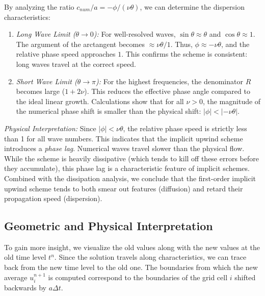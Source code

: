 By analyzing the ratio \(c_{num}/a = -\phi / (\nu\theta)\), we can determine the dispersion characteristics:

\begin{enumerate}
    \item \textit{Long Wave Limit (\(\theta \to 0\)):}
    For well-resolved waves, \(\sin\theta \approx \theta\) and \(\cos\theta \approx 1\).
    The argument of the arctangent becomes \(\approx \nu\theta / 1\).
    Thus, \(\phi \approx -\nu\theta\), and the relative phase speed approaches \(1\).
    This confirms the scheme is consistent: long waves travel at the correct speed.

    \item \textit{Short Wave Limit (\(\theta \to \pi\)):}
    For the highest frequencies, the denominator \(R\) becomes large (\(1 + 2\nu\)).
    This reduces the effective phase angle compared to the ideal linear growth.
    Calculations show that for all \(\nu > 0\), the magnitude of the numerical phase shift is smaller than the physical shift: \(|\phi| < |-\nu\theta|\).
\end{enumerate}

\textit{Physical Interpretation:}
Since \(|\phi| < \nu\theta\), the relative phase speed is strictly less than 1 for all wave numbers.
This indicates that the implicit upwind scheme introduces a \textit{phase lag}.
Numerical waves travel slower than the physical flow.
While the scheme is heavily dissipative (which tends to kill off these errors before they accumulate), this phase lag is a characteristic feature of implicit schemes.
Combined with the dissipation analysis, we conclude that the first-order implicit upwind scheme tends to both smear out features (diffusion) and retard their propagation speed (dispersion).

\subsection{Geometric and Physical Interpretation}%
\label{sub:implicit_upwind_geom_interp}

To gain more insight, we visualize the old values along with the new values at the old time level \(t^n\).
Since the solution travels along characteristics, we can trace back from the new time level to the old one.
The boundaries from which the new average \(u_{i}^{n+1}\) is computed correspond to the boundaries of the grid cell \(i\) shifted backwards by \(a\Delta t\).

